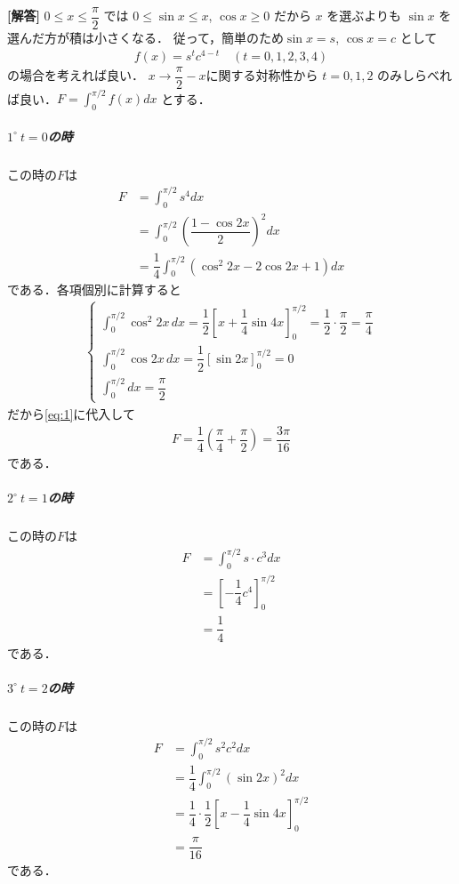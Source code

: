\documentclass[../../main.tex]{subfiles}
\begin{document}
\begin{oframed}
  
\end{oframed}

{\bf [解答]}
$0 \le x \le \dfrac{\pi}{2}$ では $0 \le \sin x \le x$, $\cos x \ge 0$ だから $x$ を選ぶよりも $\sin x$ を選んだ方が積は小さくなる．
従って，簡単のため$\sin x = s$, $\cos x = c$ として
\begin{align}
  f(x) = s^t c^{4-t} \quad (t = 0, 1, 2, 3, 4)
\end{align}
の場合を考えれば良い．
$x\to \dfrac{\pi}{2}-x$に関する対称性から $t=0, 1, 2$ のみしらべれば良い．$F = \int_0^{\pi/2} f(x) dx$ とする．

\subparagraph{$1^\circ \ t=0$の時}
この時の$F$は
\begin{align}
  F
  &= \int_0^{\pi/2} s^4 dx \\
  &= \int_0^{\pi/2} \left(\dfrac{1 - \cos 2x}{2}\right)^2 dx \\
  &= \dfrac{1}{4} \int_0^{\pi/2} (\cos^2 2x - 2\cos 2x + 1) dx \label{eq:1}
\end{align}
である．各項個別に計算すると
\begin{align}
  \begin{cases}
    \int_0^{\pi/2} \cos^2 2x \, dx = \dfrac{1}{2} \left[ x + \dfrac{1}{4} \sin 4x \right]_0^{\pi/2} = \dfrac{1}{2} \cdot \dfrac{\pi}{2} = \dfrac{\pi}{4} \\
    \int_0^{\pi/2} \cos 2x \, dx = \dfrac{1}{2} [\sin 2x]_0^{\pi/2} = 0 \\
    \int_0^{\pi/2} dx = \dfrac{\pi}{2}
  \end{cases}
\end{align}
だから\cref{eq:1}に代入して
\begin{align}
  F = \dfrac{1}{4} \left( \dfrac{\pi}{4} + \dfrac{\pi}{2} \right) = \dfrac{3\pi}{16} \label{eq:2}
\end{align}
である．

\subparagraph{$2^\circ \ t=1$の時}
この時の$F$は
\begin{align}
  F
  &= \int_0^{\pi/2} s \cdot c^3 dx  \\
  &= \left[ -\dfrac{1}{4} c^4 \right]_0^{\pi/2} \\
  &= \dfrac{1}{4} \label{eq:3}
\end{align}
である．

\subparagraph{$3^\circ \ t=2$の時}
この時の$F$は
\begin{align}
  F
  &= \int_0^{\pi/2} s^2 c^2 dx \\
  &= \dfrac{1}{4} \int_0^{\pi/2} (\sin 2x)^2 dx \\
  &= \dfrac{1}{4} \cdot \dfrac{1}{2} \left[ x - \dfrac{1}{4} \sin 4x \right]_0^{\pi/2} \\
  &= \dfrac{\pi}{16} \label{eq:4}
\end{align}
である．
\casesend
\end{document}
